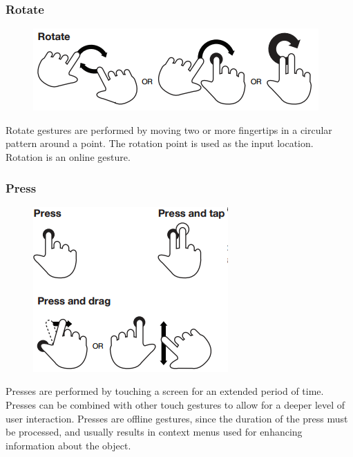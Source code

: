 \documentclass[11pt]{report}
\begin{document}
\subsubsection{Rotate}

\begin{figure}
\includegraphics[width=\textwidth]{Rotate}
\end{figure}

Rotate gestures are performed by moving two or more fingertips in a circular pattern around a point. The rotation point is used as the input location.
Rotation is an online gesture.

\subsubsection{Press}

\begin{figure}
\includegraphics[width=\textwidth]{Presses}
\end{figure}

Presses are performed by touching a screen for an extended period of time. 
Presses can be combined with other touch gestures to allow for a deeper level of user interaction.
Presses are offline gestures, since the duration of the press must be processed, and usually results in context menus used for enhancing information about the object.
\end{document}
